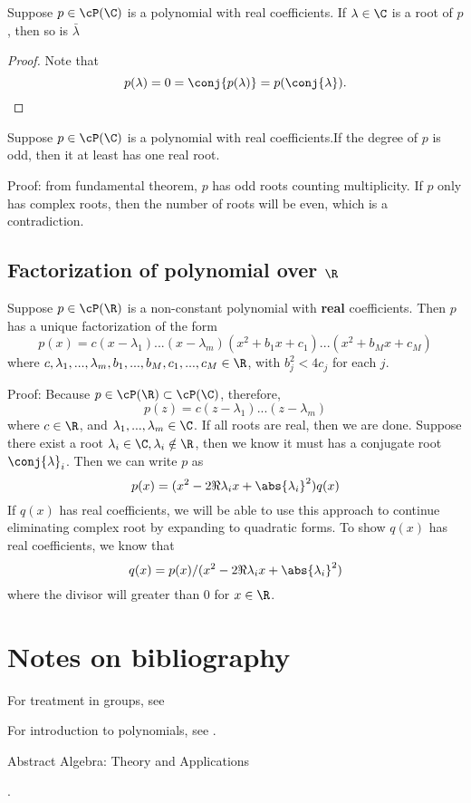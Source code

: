 \begin{refsection}
\begin{theorem}\label{ch:topics-in-abstract-algebra:th:PairedComplexRootsForRealCoefficientPolynomials}
Suppose $p\in \cP(\C)$ is a polynomial with real coefficients. If $\lambda \in \C$ is a root of $p$, then so is $\bar{\lambda}$
\end{theorem}
\begin{proof}
Note that	
 $$p(\lambda) = 0 = \conj{p(\lambda)} = p(\conj{\lambda}).$$	
\end{proof}


\begin{corollary}
Suppose $p\in \cP(\C)$ is a polynomial with real coefficients.If the degree of $p$ is odd, then it at least has one real root.
\end{corollary}
Proof: from fundamental theorem, $p$ has odd roots counting multiplicity. If $p$ only has complex roots, then the number of roots will be even, which is a contradiction.


\subsection{Factorization of polynomial over $\R$}
\begin{theorem}
Suppose $p\in \cP(\R)$ is a non-constant polynomial with \textbf{real} coefficients. Then $p$ has a unique factorization of the form
$$p(x) = c(x-\lambda_1)...(x-\lambda_m)(x^2 + b_1 x + c_1)...(x^2 + b_M x + c_M)$$
where $c,\lambda_1,...,\lambda_m,b_1,...,b_M,c_1,...,c_M \in \R$, with $b_j^2 < 4c_j$ for each $j$.
\end{theorem}
Proof: Because $p\in \cP(\R) \subset \cP(\C)$, therefore, 
$$p(z) = c(z-\lambda_1)...(z-\lambda_m)$$
where $c\in \R$, and $\lambda_1,...,\lambda_m \in \C$. If all roots are real, then we are done. Suppose there exist a root $\lambda_i \in \C, \lambda_i \notin \R$, then we know it must has a conjugate root $\conj{\lambda}_i$. Then we can write $p$ as
$$p(x) = (x^2 - 2\Re \lambda_i x + \abs{\lambda_i}^2) q(x)$$
If $q(x)$ has real coefficients, we will be able to use this approach to continue eliminating complex root by expanding to quadratic forms. To show $q(x)$ has real coefficients, we know that
$$q(x) = p(x)/(x^2 - 2\Re \lambda_i x + \abs{\lambda_i}^2)$$
where the divisor will greater than 0 for $x\in \R$.


\section{Notes on bibliography}

For treatment in groups, see\cite{armstrong2013groups}

For introduction to polynomials, see \cite{axler2015linear}.

Abstract Algebra: Theory and Applications


\cite{Beachy2006abstract}.

\printbibliography
\end{refsection}